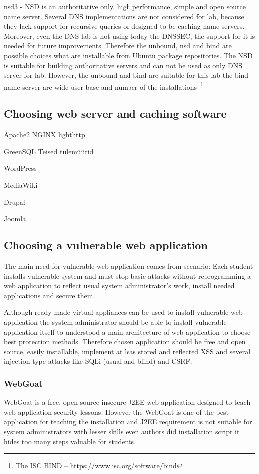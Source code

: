 nsd3  - NSD is an authoritative only, high performance, simple and open source name server. 
Several \gls{DNS} implementations are not considered for lab, because they lack support for recursive queries or designed to be caching name servers. Moreover, even the \gls{DNS} lab is not using today the \gls{DNSSEC}, the support for it is needed for future improvements. Therefore the unbound, nsd and bind are possible choices what are installable from Ubuntu package repositories. The NSD is suitable for building authoritative servers and can not be used as only \gls{DNS} server for lab.
However, the unbound and bind are suitable for this lab the bind name-server are wide user base and number of the installations~\footnote{The \gls{ISC} BIND -- \url{https://www.isc.org/software/bind}}


\subsection{Choosing web server and caching software}

Apache2
NGINX
lighthttp

GreenSQL
Teised tulemüürid


WordPress

MediaWiki

Drupal

Joomla

\subsection{Choosing a vulnerable web application}

The main need for vulnerable web application comes from scenario: Each student installs vulnerable system and must stop basic attacks without reprogramming a web application to reflect usual system administrator's work,  install needed applications and secure them.

Although ready made virtual appliances can be used to install vulnerable web application the
system administrator should be able to install vulnerable application itself to understood a main architecture of web application to choose best protection methods. Therefore chosen application should be free and open source, easily installable, implement at leas stored and reflected \gls{XSS} and several injection type attacks like \gls{SQLi} (usual and blind) and \gls{CSRF}.

\subsubsection{WebGoat}
WebGoat is a free, open source insecure J2EE web application designed to teach web application security lessons.  However the WebGoat is one of the best application for teaching the installation and J2EE requirement is not suitable for system administrators with lesser skills even authors did installation script it hides too many steps valuable for students. 


